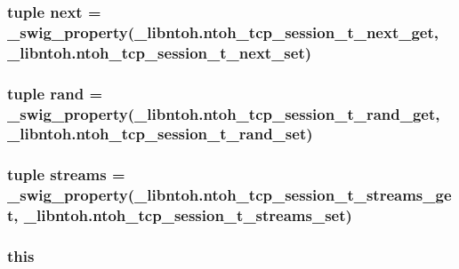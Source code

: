 \hypertarget{classlibntoh_1_1ntoh__tcp__session__t_a84e6dac37062f5a539ece8248c8567cc}{
\subsubsection[{next}]{\setlength{\rightskip}{0pt plus 5cm}tuple next = {\bf \-\_\-swig\-\_\-property}(\-\_\-libntoh.\-ntoh\-\_\-tcp\-\_\-session\-\_\-t\-\_\-next\-\_\-get, \-\_\-libntoh.\-ntoh\-\_\-tcp\-\_\-session\-\_\-t\-\_\-next\-\_\-set)\hspace{0.3cm}{\ttfamily [static]}}}\label{classlibntoh_1_1ntoh__tcp__session__t_a84e6dac37062f5a539ece8248c8567cc}
\hypertarget{classlibntoh_1_1ntoh__tcp__session__t_afdb09afb7e6838badc0bf2a63b8df8c5}{
\subsubsection[{rand}]{\setlength{\rightskip}{0pt plus 5cm}tuple rand = {\bf \-\_\-swig\-\_\-property}(\-\_\-libntoh.\-ntoh\-\_\-tcp\-\_\-session\-\_\-t\-\_\-rand\-\_\-get, \-\_\-libntoh.\-ntoh\-\_\-tcp\-\_\-session\-\_\-t\-\_\-rand\-\_\-set)\hspace{0.3cm}{\ttfamily [static]}}}\label{classlibntoh_1_1ntoh__tcp__session__t_afdb09afb7e6838badc0bf2a63b8df8c5}
\hypertarget{classlibntoh_1_1ntoh__tcp__session__t_a89d606a1c25ff8a032d2716489f69fcc}{
\subsubsection[{streams}]{\setlength{\rightskip}{0pt plus 5cm}tuple streams = {\bf \-\_\-swig\-\_\-property}(\-\_\-libntoh.\-ntoh\-\_\-tcp\-\_\-session\-\_\-t\-\_\-streams\-\_\-get, \-\_\-libntoh.\-ntoh\-\_\-tcp\-\_\-session\-\_\-t\-\_\-streams\-\_\-set)\hspace{0.3cm}{\ttfamily [static]}}}\label{classlibntoh_1_1ntoh__tcp__session__t_a89d606a1c25ff8a032d2716489f69fcc}
\hypertarget{classlibntoh_1_1ntoh__tcp__session__t_a05c09a5e9d53fa7adf0a7936038c2fa3}{
\subsubsection[{this}]{\setlength{\rightskip}{0pt plus 5cm}this}}\label{classlibntoh_1_1ntoh__tcp__session__t_a05c09a5e9d53fa7adf0a7936038c2fa3}
